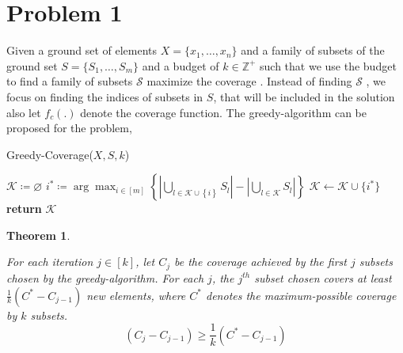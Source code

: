 \documentclass{article}
\numberwithin{equation}{section}
\newtheorem{theorem}{Theorem}
\numberwithin{theorem}{section}
\numberwithin{lemma}{section}
\newcommand{\curlyBrace}[1]{\left\{#1\right\}}
\begin{document}
\section{Problem 1}
Given a ground set of elements $X= \{x_1, \dots, x_n\}$ and a family of subsets of the ground set $S = \{S_1, \dots, S_m\}$ and a budget of $k\in\mathbb{Z}^{+}$ such that we use the budget to find a family of subsets $\mathcal{S}$  maximize the coverage . Instead of finding $\mathcal{S}$ , we focus on finding the indices of subsets in $S$, that will be included in the solution also let $f_c(.)$ denote the coverage function.  The greedy-algorithm can be proposed for the problem, 

\begin{algorithm}[H]
    \caption{Greedy-Coverage($X, S, k$)}
    \begin{algorithmic}[1]
        \State $\mathcal{K}\coloneqq \varnothing$
            \State $ i^* \coloneqq \arg\max_{i\in[m]} \curlyBrace{\left\vert\bigcup_{l\in\mathcal{K} \cup \curlyBrace{i}} S_l \right\vert - \left\vert \bigcup_{l\in\mathcal{K}} S_l \right\vert }$ 
            \State $\mathcal{K} \leftarrow \mathcal{K} \cup \{i^*\}$
    \EndFor
    \State \textbf{return} $\mathcal{K}$ 
\end{algorithmic}
\end{algorithm}
\begin{theorem}
\label{t1}

    For each iteration $j \in [k]$, let $C_j$ be the coverage achieved by the first $j$ subsets chosen by the greedy-algorithm. For each $j$, the $j^{th}$ subset chosen covers at least $\frac{1}{k}(C^* - C_{j-1})$  new elements, where $C^*$ denotes the maximum-possible coverage by $k$ subsets. 
        \begin{equation}
        \label{e1}
        (C_j - C_{j-1}) \ge \frac{1}{k}(C^* - C_{j-1}) 
    \end{equation}
\end{theorem}
\end{document}
